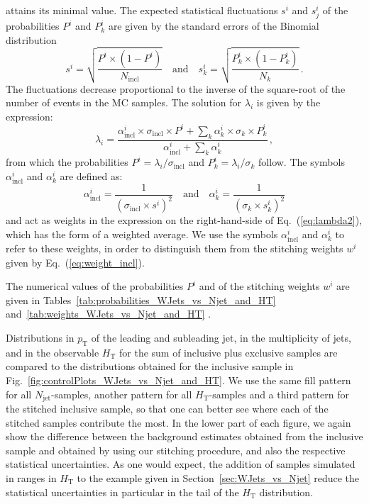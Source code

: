 \documentclass[twocolumn,epjc3]{svjour3}
\newcommand{\pT}{\ensuremath{p_{\textrm{T}}}\xspace}
\newcommand{\HT}{\ensuremath{H_{\mathrm{T}}}\xspace}
\newcommand{\incl}{\ensuremath{\textrm{incl}}\xspace}
\newcommand{\jet}{\ensuremath{\textrm{jet}}\xspace}
\begin{document}
attains its minimal value.
The expected statistical fluctuations $s^{i}$ and $s_{j}^{i}$ of the probabilities $P^{i}$ and $P_{k}^{i}$
are given by the standard errors of the Binomial distribution~\cite{Cowan:1998ji}
\begin{equation*}
s^{i} = \sqrt{\frac{P^{i} \times (1 - P^{i})}{N_{\incl}}} \quad \mbox{and} \quad s_{k}^{i} = \sqrt{\frac{P_{k}^{i} \times (1 - P_{k}^{i})}{N_{k}}} \, .
\end{equation*}
The fluctuations decrease proportional to the inverse of the square-root of the number of events in the MC samples.
The solution for $\lambda_{i}$ is given by the expression:
\begin{equation}
\lambda_{i} = \frac{\alpha_{\incl}^{i} \times \sigma_{\incl} \times P^{i} + \sum_{k} \alpha_{k}^{i} \times \sigma_{k} \times P_{k}^{i}}{\alpha_{\incl}^{i} + \sum_{k} \alpha_{k}^{i}} \, ,
\label{eq:lambda2}
\end{equation}
from which the probabilities $P^{i} = \lambda_{i}/\sigma_{\incl}$ and $P_{k}^{i} = \lambda_{i}/\sigma_{k}$ follow.
The symbols $\alpha_{\incl}^{i}$ and $\alpha_{k}^{i}$ are defined as:
\begin{equation*}
\alpha_{\incl}^{i} = \frac{1}{\left( \sigma_{\incl} \times s^{i} \right)^{2}} \quad \mbox{and} \quad \alpha_{k}^{i} = \frac{1}{\left( \sigma_{k} \times s_{k}^{i} \right)^{2}}
\end{equation*}
and act as weights in the expression on the right-hand-side of Eq.~(\ref{eq:lambda2}),
which has the form of a weighted average.
We use the symbols $\alpha_{\incl}^{i}$ and $\alpha_{k}^{i}$ to refer to these weights,
in order to distinguish them from the stitching weights $w^{i}$ given by Eq.~(\ref{eq:weight_incl}).

The numerical values of the probabilities $P^{i}$ and of the stitching weights $w^{i}$ are given in Tables~\ref{tab:probabilities_WJets_vs_Njet_and_HT}
and~\ref{tab:weights_WJets_vs_Njet_and_HT}
.

Distributions in $\pT$ of the leading and subleading jet,
in the multiplicity of jets, and in the observable $\HT$ 
for the sum of inclusive plus exclusive samples are compared to the distributions obtained for the inclusive sample in Fig.~\ref{fig:controlPlots_WJets_vs_Njet_and_HT}.
We use the same fill pattern for all $N_{\jet}$-samples, another pattern for all $\HT$-samples and a third pattern for the stitched inclusive sample,
so that one can better see where each of the stitched samples contribute the most.
In the lower part of each figure, we again show the difference between the background estimates obtained from the inclusive sample and obtained by using our stitching procedure,
and also the respective statistical uncertainties.
As one would expect, the addition of samples simulated in ranges in $\HT$ to the example given in Section~\ref{sec:WJets_vs_Njet}
reduce the statistical uncertainties in particular in the tail of the $\HT$ distribution.
\end{document}
